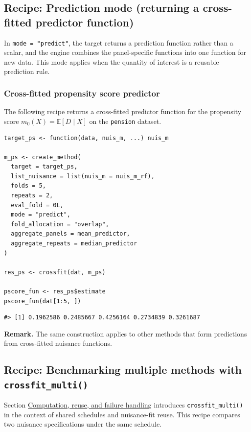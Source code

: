 \subsection{Recipe: Prediction mode (returning a cross-fitted predictor function)}\label{app:predict}

In \texttt{mode\ =\ "predict"}, the target returns a prediction function rather than a scalar, and the engine combines the panel-specific functions into one function for new data. This mode applies when the quantity of interest is a reusable prediction rule.

\subsubsection{Cross-fitted propensity score predictor}\label{cross-fitted-propensity-score-predictor}

The following recipe returns a cross-fitted predictor function for the propensity score \(m_0(X) = \mathbb{E}\left[D \mid X\right]\) on the \texttt{pension} dataset.

\begin{verbatim}
target_ps <- function(data, nuis_m, ...) nuis_m

m_ps <- create_method(
  target = target_ps,
  list_nuisance = list(nuis_m = nuis_m_rf),
  folds = 5,
  repeats = 2,
  eval_fold = 0L,
  mode = "predict",
  fold_allocation = "overlap",
  aggregate_panels = mean_predictor,
  aggregate_repeats = median_predictor
)

res_ps <- crossfit(dat, m_ps)

pscore_fun <- res_ps$estimate
pscore_fun(dat[1:5, ])
\end{verbatim}

\begin{verbatim}
#> [1] 0.1962586 0.2485667 0.4256164 0.2734839 0.3261687
\end{verbatim}

\textbf{Remark.} The same construction applies to other methods that form predictions from cross-fitted nuisance functions.

\subsection{\texorpdfstring{Recipe: Benchmarking multiple methods with \texttt{crossfit\_multi()}}{Recipe: Benchmarking multiple methods with crossfit\_multi()}}\label{app:multi}

Section \hyperref[subsec:performance]{Computation, reuse, and failure handling} introduces \texttt{crossfit\_multi()} in the context of shared schedules and nuisance-fit reuse. This recipe compares two nuisance specifications under the same schedule.


